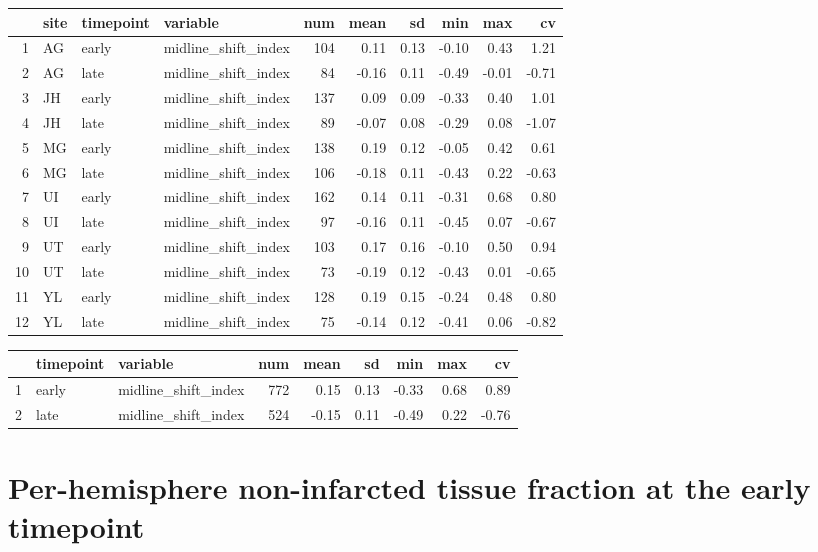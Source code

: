 \documentclass[
]{article}
\begin{document}
\begin{table}[ht]
\centering
\begin{tabular}{rlllrrrrrr}
  \hline
 & site & timepoint & variable & num & mean & sd & min & max & cv \\ 
  \hline
1 & AG & early & midline\_shift\_index & 104 & 0.11 & 0.13 & -0.10 & 0.43 & 1.21 \\ 
  2 & AG & late & midline\_shift\_index &  84 & -0.16 & 0.11 & -0.49 & -0.01 & -0.71 \\ 
  3 & JH & early & midline\_shift\_index & 137 & 0.09 & 0.09 & -0.33 & 0.40 & 1.01 \\ 
  4 & JH & late & midline\_shift\_index &  89 & -0.07 & 0.08 & -0.29 & 0.08 & -1.07 \\ 
  5 & MG & early & midline\_shift\_index & 138 & 0.19 & 0.12 & -0.05 & 0.42 & 0.61 \\ 
  6 & MG & late & midline\_shift\_index & 106 & -0.18 & 0.11 & -0.43 & 0.22 & -0.63 \\ 
  7 & UI & early & midline\_shift\_index & 162 & 0.14 & 0.11 & -0.31 & 0.68 & 0.80 \\ 
  8 & UI & late & midline\_shift\_index &  97 & -0.16 & 0.11 & -0.45 & 0.07 & -0.67 \\ 
  9 & UT & early & midline\_shift\_index & 103 & 0.17 & 0.16 & -0.10 & 0.50 & 0.94 \\ 
  10 & UT & late & midline\_shift\_index &  73 & -0.19 & 0.12 & -0.43 & 0.01 & -0.65 \\ 
  11 & YL & early & midline\_shift\_index & 128 & 0.19 & 0.15 & -0.24 & 0.48 & 0.80 \\ 
  12 & YL & late & midline\_shift\_index &  75 & -0.14 & 0.12 & -0.41 & 0.06 & -0.82 \\ 
   \hline
\end{tabular}
\end{table}
\begin{table}[ht]
\centering
\begin{tabular}{rllrrrrrr}
  \hline
 & timepoint & variable & num & mean & sd & min & max & cv \\ 
  \hline
1 & early & midline\_shift\_index & 772 & 0.15 & 0.13 & -0.33 & 0.68 & 0.89 \\ 
  2 & late & midline\_shift\_index & 524 & -0.15 & 0.11 & -0.49 & 0.22 & -0.76 \\ 
   \hline
\end{tabular}
\end{table}

\hypertarget{per-hemisphere-non-infarcted-tissue-fraction-at-the-early-timepoint}{%
\section{Per-hemisphere non-infarcted tissue fraction at the early
timepoint}\label{per-hemisphere-non-infarcted-tissue-fraction-at-the-early-timepoint}}
\end{document}
